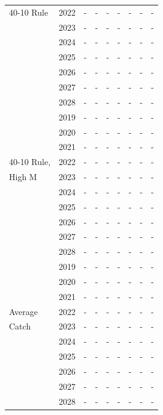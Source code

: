\documentclass[12pt,]{article}
\begin{document}
\begin{table}[ht]
{\begin{tabular}{l|cc|>{\centering}p{.7in}c|>{\centering}p{.7in}c|>{\centering}p{.7in}c}
  40-10 Rule & 2022 & - & - & - & - & - & - & - \\ 
   & 2023 & - & - & - & - & - & - & - \\ 
   & 2024 & - & - & - & - & - & - & - \\ 
   & 2025 & - & - & - & - & - & - & - \\ 
   & 2026 & - & - & - & - & - & - & - \\ 
   & 2027 & - & - & - & - & - & - & - \\ 
   & 2028 & - & - & - & - & - & - & - \\ 
   \hline
 & 2019 & - & - & - & - & - & - & - \\ 
   & 2020 & - & - & - & - & - & - & - \\ 
   & 2021 & - & - & - & - & - & - & - \\ 
  40-10 Rule, & 2022 & - & - & - & - & - & - & - \\ 
  High M & 2023 & - & - & - & - & - & - & - \\ 
   & 2024 & - & - & - & - & - & - & - \\ 
   & 2025 & - & - & - & - & - & - & - \\ 
   & 2026 & - & - & - & - & - & - & - \\ 
   & 2027 & - & - & - & - & - & - & - \\ 
   & 2028 & - & - & - & - & - & - & - \\ 
   \hline
 & 2019 & - & - & - & - & - & - & - \\ 
   & 2020 & - & - & - & - & - & - & - \\ 
   & 2021 & - & - & - & - & - & - & - \\ 
  Average & 2022 & - & - & - & - & - & - & - \\ 
  Catch & 2023 & - & - & - & - & - & - & - \\ 
   & 2024 & - & - & - & - & - & - & - \\ 
   & 2025 & - & - & - & - & - & - & - \\ 
   & 2026 & - & - & - & - & - & - & - \\ 
   & 2027 & - & - & - & - & - & - & - \\ 
   & 2028 & - & - & - & - & - & - & - \\ 
   \hline
\end{tabular}
}
\end{table}

\end{document}
